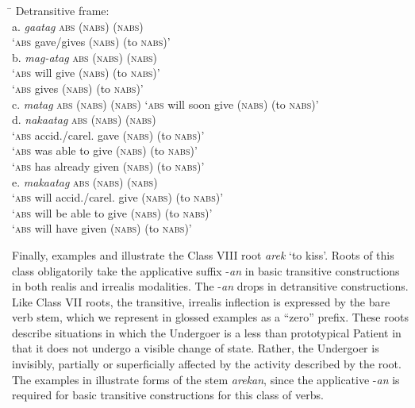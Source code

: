 \begin{tabbing}
\hspace{4.4cm} \= \kill
\label{bkm:Ref148532042}Detransitive frame: \\
a.  \textit{gaatag} \textsc{abs} (\textsc{nabs}) (\textsc{nabs}) \\
\> ‘\textsc{abs} gave/gives (\textsc{nabs}) (to \textsc{nabs})’ \\
b.  \textit{mag-atag} \textsc{abs} (\textsc{nabs}) (\textsc{nabs}) \\
\> ‘\textsc{abs} will give (\textsc{nabs}) (to \textsc{nabs})’ \\
\>        ‘\textsc{abs} gives (\textsc{nabs}) (to \textsc{nabs})’ \\
c.  \textit{matag} \textsc{abs} (\textsc{nabs}) (\textsc{nabs}) \> ‘\textsc{abs} will soon give (\textsc{nabs}) (to \textsc{nabs})’ \\
d.  \textit{nakaatag} \textsc{abs} (\textsc{nabs}) (\textsc{nabs}) \\
\> ‘\textsc{abs} accid./carel. gave (\textsc{nabs}) (to \textsc{nabs})’ \\
\>        ‘\textsc{abs} was able to give (\textsc{nabs}) (to \textsc{nabs})’ \\
\>        ‘\textsc{abs} has already given (\textsc{nabs}) (to \textsc{nabs})’ \\
e.  \textit{makaatag} \textsc{abs} (\textsc{nabs}) (\textsc{nabs}) \\
\> ‘\textsc{abs} will accid./carel. give (\textsc{nabs}) (to \textsc{nabs})’ \\
\>        ‘\textsc{abs} will be able to give (\textsc{nabs}) (to \textsc{nabs})’ \\
\>        ‘\textsc{abs} will have given (\textsc{nabs}) (to \textsc{nabs})’
\end{tabbing}
\z

Finally, examples  and  illustrate the Class VIII root \textit{arek} ‘to kiss’. Roots of this class obligatorily take the applicative suffix -\textit{an} in basic transitive constructions in both realis and irrealis modalities. The -\textit{an} drops in detransitive constructions. Like Class VII roots, the transitive, irrealis inflection is expressed by the bare verb stem, which we represent in glossed examples as a “zero” prefix. These roots describe situations in which the Undergoer is a less than prototypical Patient in that it does not undergo a visible change of state. Rather, the Undergoer is invisibly, partially or superficially affected by the activity described by the root. The examples in  illustrate forms of the stem \textit{arekan}, since the applicative -\textit{an} is required for basic transitive constructions for this class of verbs. 

